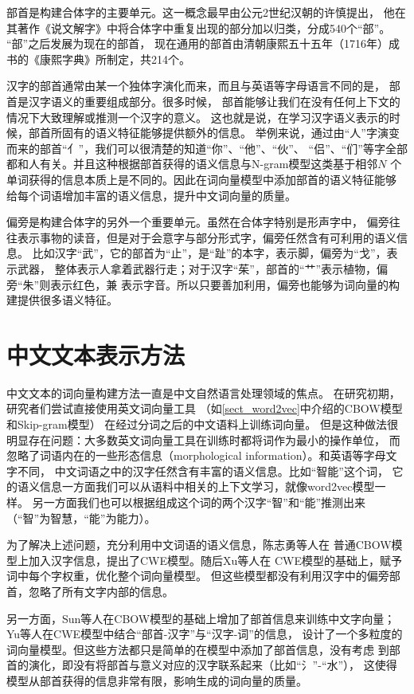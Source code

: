 部首是构建合体字的主要单元。这一概念最早由公元2世纪汉朝的许慎提出，
他在其著作《说文解字》中将合体字中重复出现的部分加以归类，分成540个“部”。
“部”之后发展为现在的部首，
现在通用的部首由清朝康熙五十五年（1716年）成书的《康熙字典》所制定，共214个。

汉字的部首通常由某一个独体字演化而来，而且与英语等字母语言不同的是，
部首是汉字语义的重要组成部分。很多时候，
部首能够让我们在没有任何上下文的情况下大致理解或推测一个汉字的意义。
这也就是说，在学习汉字语义表示的时候，部首所固有的语义特征能够提供额外的信息。
举例来说，通过由“人”字演变而来的部首“亻”，我们可以很清楚的知道“你”、“他”、“伙”、
“侣”、“们”等字全部都和人有关。并且这种根据部首获得的语义信息与N-gram模型这类基于相邻$N$
个单词获得的信息本质上是不同的。因此在词向量模型中添加部首的语义特征能够
给每个词语增加丰富的语义信息，提升中文词向量的质量。

偏旁是构建合体字的另外一个重要单元。虽然在合体字特别是形声字中，
偏旁往往表示事物的读音，但是对于会意字与部分形式字，偏旁任然含有可利用的语义信息。
比如汉字“武”，它的部首为“止”，是“趾”的本字，表示脚，偏旁为“戈”，表示武器，
整体表示人拿着武器行走；对于汉字“茱”，部首的“艹”表示植物，偏旁“朱”则表示红色，兼
表示字音。所以只要善加利用，偏旁也能够为词向量的构建提供很多语义特征。

\section{中文文本表示方法}
中文文本的词向量构建方法一直是中文自然语言处理领域的焦点。
在研究初期，研究者们尝试直接使用英文词向量工具
（如\ref{sect_word2vec}中介绍的CBOW模型和Skip-gram模型）
在经过分词之后的中文语料上训练词向量。
但是这种做法很明显存在问题：大多数英文词向量工具在训练时都将词作为最小的操作单位，
而忽略了词语内在的一些形态信息（morphological information）。和英语等字母文字不同，
中文词语之中的汉字任然含有丰富的语义信息。比如“智能”这个词，
它的语义信息一方面我们可以从语料中相关的上下文学习，就像word2vec模型一样。
另一方面我们也可以根据组成这个词的两个汉字“智”和“能”推测出来（“智”为智慧，“能”为能力）。

为了解决上述问题，充分利用中文词语的语义信息，陈志勇等人在
普通CBOW模型上加入汉字信息，提出了CWE模型。随后Xu等人在
CWE模型的基础上，赋予词中每个字权重，优化整个词向量模型。
但这些模型都没有利用汉字中的偏旁部首，忽略了所有文字内部的信息。

另一方面，Sun等人在CBOW模型的基础上增加了部首信息来训练中文字向量；
Yu等人在CWE模型中结合“部首-汉字”与“汉字-词”的信息，
设计了一个多粒度的词向量模型。但这些方法都只是简单的在模型中添加了部首信息，没有考虑
到部首的演化，即没有将部首与意义对应的汉字联系起来（比如“氵”-“水”），
这使得模型从部首获得的信息非常有限，影响生成的词向量的质量。


